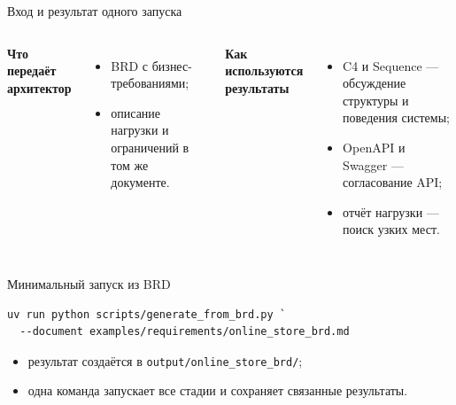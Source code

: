 \documentclass[aspectratio=169,10pt]{beamer}
\begin{document}
\begin{frame}{Вход и результат одного запуска}
  \begin{center}
  \end{center}
  \vspace{0.35cm}
  \begin{columns}[T,onlytextwidth]
      \textbf{Что передаёт архитектор}
      \begin{itemize}
        \item BRD с бизнес-требованиями;
        \item описание нагрузки и ограничений в том же документе.
      \end{itemize}
      \textbf{Как используются результаты}
      \begin{itemize}
        \item C4 и Sequence — обсуждение структуры и поведения системы;
        \item OpenAPI и Swagger — согласование API;
        \item отчёт нагрузки — поиск узких мест.
      \end{itemize}
  \end{columns}
\end{frame}

\begin{frame}[fragile]{Минимальный запуск из BRD}
  \vspace{0.3cm}
  \begin{lstlisting}[basicstyle=\ttfamily\small]
uv run python scripts/generate_from_brd.py `
  --document examples/requirements/online_store_brd.md
  \end{lstlisting}
  \vspace{0.35cm}
  \begin{itemize}
    \item результат создаётся в \texttt{output/online\_store\_brd/};
    \item одна команда запускает все стадии и сохраняет связанные результаты.
  \end{itemize}
\end{frame}
\end{document}
